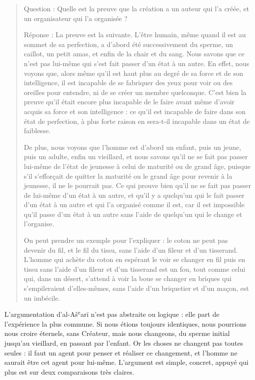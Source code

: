 \begin{quote}
   Question : Quelle est la preuve que la création a un auteur qui l'a
créée, et un organisateur qui l'a organisée ?

Réponse : La preuve est la suivante. L'être humain, même quand il est au
sommet de sa perfection, a d'abord été successivement du sperme, un
caillot, un petit amas, et enfin de la chair et du sang. Nous savons que
ce n'est pas lui-même qui s'est fait passer d'un état à un autre. En
effet, nous voyons que, alors même qu'il est haut plus au degré de sa
force et de son intelligence, il est incapable de se fabriquer des yeux
pour voir ou des oreilles pour entendre, ni de se créer un membre
quelconque. C'est bien la preuve qu'il était encore plus incapable de le
faire avant même d'avoir acquis sa force et son intelligence : ce qu'il
est incapable de faire dans son état de perfection, à plus forte raison
en sera-t-il incapable dans un état de faiblesse.

De plus, nous voyons que l'homme est d'abord un enfant, puis un jeune,
puis un adulte, enfin un vieillard, et nous savons qu'il ne se fait pas
passer lui-même de l'état de jeunesse à celui de maturité ou de grand
âge, puisque s'il s'efforçait de quitter la maturité ou le grand âge
pour revenir à la jeunesse, il ne le pourrait pas. Ce qui prouve bien
qu'il ne se fait pas passer de lui-même d'un état à un autre, et qu'il y
a quelqu'un qui le fait passer d'un état à un autre et qui l'a organisé
comme il est, car il est impossible qu'il passe d'un état à un autre
sans l'aide de quelqu'un qui le change et l'organise.

On peut prendre un exemple pour l'expliquer : le coton ne peut pas
devenir du fil, et le fil du tissu, sans l'aide d'un fileur et d'un
tisserand. L'homme qui achète du coton en espérant le voir se changer en
fil puis en tissu sans l'aide d'un fileur et d'un tisserand est un fou,
tout comme celui qui, dans un désert, s'attend à voir la boue se changer
en briques qui s'empileraient d'elles-mêmes, sans l'aide d'un briquetier
et d'un maçon, est un imbécile. 
\end{quote}


L'argumentation d'al-Ašʿarī n'est pas abstraite ou logique : elle part
de l'expérience la plus commune. Si nous étions toujours identiques,
nous pourrions nous croire éternels, sans Créateur, mais nous changeons,
du sperme initial jusqu'au vieillard, en passant par l'enfant. Or les
choses ne changent pas toutes seules : il faut un agent pour penser et
réaliser ce changement, et l'homme ne saurait être cet agent pour
lui-même. L'argument est simple, concret, appuyé qui plus est sur deux
comparaisons très claires.

